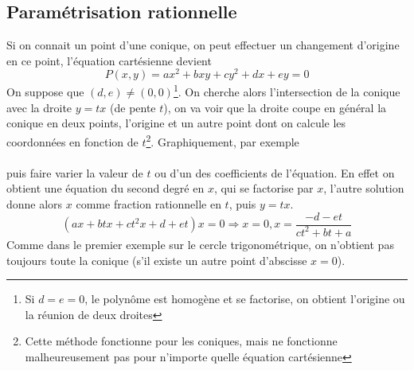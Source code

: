 \documentclass[a4paper,11pt]{book}
\begin{document}
\begin{giacjshere}
\subsection{Param\'etrisation rationnelle}
Si on connait un point d'une conique, on peut effectuer
un changement d'origine en ce point, l'\'equation cart\'esienne
devient
$$P(x,y)=ax^2+bxy+cy^2+dx+ey=0$$
On suppose que $(d,e)\neq(0,0)$\footnote{Si $d=e=0$, le
polyn\^ome est homog\`ene et se factorise,
on obtient l'origine ou la r\'eunion de deux droites}.
On cherche alors l'intersection de la conique avec la droite $y=tx$
(de pente $t$), on va voir que la droite coupe en g\'en\'eral la
conique en deux points, l'origine et un autre point dont on
calcule les coordonn\'ees en fonction de $t$\footnote{Cette m\'ethode
fonctionne pour les coniques, mais ne fonctionne malheureusement
pas pour n'importe quelle \'equation cart\'esienne}.
Graphiquement, par exemple\\
\\
puis faire varier la valeur de $t$ ou d'un des coefficients de
l'\'equation.
En effet on obtient une \'equation du second degr\'e en $x$,
qui se factorise par $x$, l'autre solution donne alors $x$ comme
fraction rationnelle en $t$, puis $y=tx$.
$$ (ax+btx+ct^2x+d+et)x=0 \Rightarrow x=0, x=\frac{-d-et}{ct^2+bt+a}$$
Comme dans le premier exemple sur le cercle trigonom\'etrique,
on n'obtient pas toujours toute la conique (s'il existe un autre
point d'abscisse $x=0$).


\end{giacjshere}
\end{document}
